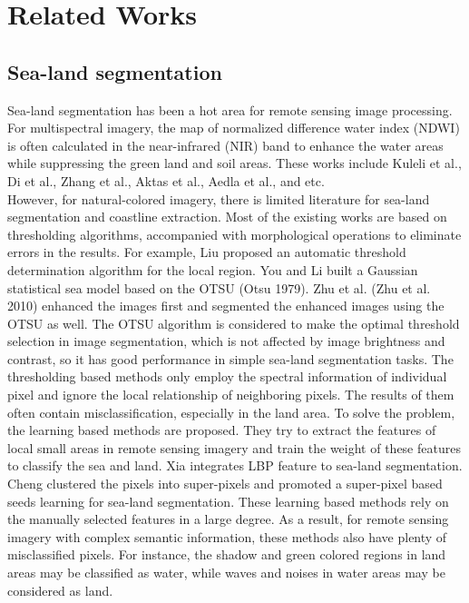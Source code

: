 \documentclass[conference]{IEEEtran}
\begin{document}
\section{Related Works}

\subsection{Sea-land segmentation}

Sea-land segmentation has been a hot area for remote sensing image processing. For multispectral imagery, the map of normalized difference water index (NDWI) is often calculated in the near-infrared (NIR) band to enhance the water areas while suppressing the green land and soil areas. These works include Kuleli et al.\cite{b5}, Di et al.\cite{b6}, Zhang et al.\cite{b7}, Aktas et al.\cite{b8}, Aedla et al.\cite{b9}, and etc.\\

However, for natural-colored imagery, there is limited literature for sea-land segmentation and coastline extraction. Most of the existing works are based on thresholding algorithms, accompanied with morphological operations to eliminate errors in the results. For example, Liu\cite{b2} proposed an automatic threshold determination algorithm for the local region. You and Li\cite{b10} built a Gaussian statistical sea model based on the OTSU (Otsu 1979)\cite{b1}.  Zhu et al. (Zhu et al. 2010)\cite{b11} enhanced the images first and segmented the enhanced images using the OTSU as well. The OTSU algorithm is considered to make the optimal threshold selection in image segmentation, which is not affected by image brightness and contrast, so it has good performance in simple sea-land segmentation tasks. The thresholding based methods only employ the spectral information of individual pixel and ignore the local relationship of neighboring pixels. The results of them often contain misclassiﬁcation, especially in the land area. To solve the problem, the learning based methods are proposed. They try to extract the features of local small areas in remote sensing imagery and train the weight of these features to classify the sea and land. Xia\cite{b12} integrates LBP feature to sea-land segmentation. Cheng\cite{b13}  clustered the pixels into super-pixels and promoted a super-pixel based seeds learning for sea-land segmentation. These learning based methods rely on the manually selected features in a large degree. As a result, for remote sensing imagery with complex semantic information, these methods also have plenty of misclassified pixels.   For instance, the shadow and green colored regions in land areas may be classiﬁed as water, while waves and noises in water areas may be considered as land.\\
\end{document}
